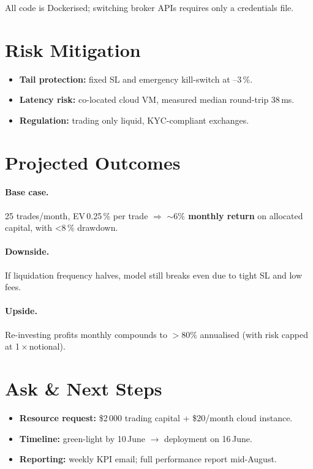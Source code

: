 \documentclass{article}
\begin{document}
All code is Dockerised; switching broker APIs
requires only a credentials file.

\section{Risk Mitigation}

\begin{itemize}
  \item \textbf{Tail protection:} fixed SL and emergency kill-switch at --3\,\%.
  \item \textbf{Latency risk:} co-located cloud VM, measured median
        round-trip 38\,ms.
  \item \textbf{Regulation:} trading only liquid, KYC-compliant exchanges.
\end{itemize}

\section{Projected Outcomes}

\paragraph{Base case.}
25 trades/month, EV\,0.25\,\% per trade $\Rightarrow$ \textbf{\(\sim6\%\) monthly
return} on allocated capital, with <8\,\% drawdown.

\paragraph{Downside.}
If liquidation frequency halves, model still breaks even due to
tight SL and low fees.

\paragraph{Upside.}
Re-investing profits monthly compounds to \(>\!80\%\) annualised
(with risk capped at 1\,$\times$\,notional).

\section{Ask \& Next Steps}

\begin{itemize}
  \item \textbf{Resource request:} \$2\,000 trading capital +
        \$20/month cloud instance.
  \item \textbf{Timeline:} green-light by 10\,June $\rightarrow$ deployment on 16\,June.
  \item \textbf{Reporting:} weekly KPI email; full performance report
        mid-August.
\end{itemize}

\renewcommand{\cftdot}{.}
\renewcommand{\cftdotsep}{2}

\end{document}
